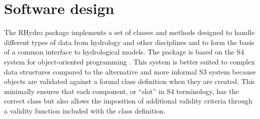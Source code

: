 \documentclass{icldt}\usepackage[]{graphicx}\usepackage[]{color}
\begin{document}





\section{Software design}
The RHydro package implements a set of classes and methods designed to handle different types of data from hydrology and other disciplines and to form the basis of a common interface to hydrological models. The package is based on the S4 system for object-oriented programming \citep{chambers1998,chambers2008}. This system is better suited to complex data structures compared to the alternative and more informal S3 system because objects are validated against a formal class definition when they are created. This minimally ensures that each component, or ``slot'' in S4 terminology, has the correct class but also allows the imposition of additional validity criteria through a validity function included with the class definition. \\

\end{document}
